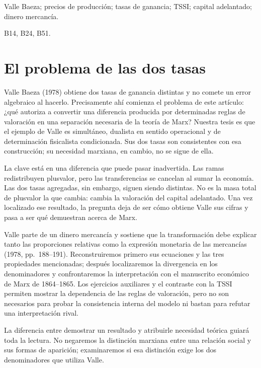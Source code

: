 \documentclass[10pt,twoside]{article}
\begin{document}
\vspace{5mm}
 Valle Baeza; precios de producción; tasas de ganancia; TSSI; capital adelantado; dinero mercancía.\par
\vspace{3mm}
 B14, B24, B51.\par
\clearpage

\section{El problema de las dos tasas}
Valle Baeza (1978) obtiene dos tasas de ganancia distintas y no comete un error algebraico al hacerlo. Precisamente ahí comienza el problema de este artículo: ¿qué autoriza a convertir una diferencia producida por determinadas reglas de valoración en una separación necesaria de la teoría de Marx? Nuestra tesis es que el ejemplo de Valle es simultáneo, dualista en sentido operacional y de determinación fisicalista condicionada. Sus dos tasas son consistentes con esa construcción; su necesidad marxiana, en cambio, no se sigue de ella.

La clave está en una diferencia que puede pasar inadvertida. Las ramas redistribuyen plusvalor, pero las transferencias se cancelan al sumar la economía. Las dos tasas agregadas, sin embargo, siguen siendo distintas. No es la masa total de plusvalor la que cambia: cambia la valoración del capital adelantado. Una vez localizado ese resultado, la pregunta deja de ser cómo obtiene Valle sus cifras y pasa a ser qué demuestran acerca de Marx.

Valle parte de un dinero mercancía y sostiene que la transformación debe explicar tanto las proporciones relativas como la expresión monetaria de las mercancías (1978, pp.~188--191). Reconstruiremos primero sus ecuaciones y las tres propiedades mencionadas; después localizaremos la divergencia en los denominadores y confrontaremos la interpretación con el manuscrito económico de Marx de 1864--1865. Los ejercicios auxiliares y el contraste con la TSSI permiten mostrar la dependencia de las reglas de valoración, pero no son necesarios para probar la consistencia interna del modelo ni bastan para refutar una interpretación rival.

La diferencia entre demostrar un resultado y atribuirle necesidad teórica guiará toda la lectura. No negaremos la distinción marxiana entre una relación social y sus formas de aparición; examinaremos si esa distinción exige los dos denominadores que utiliza Valle.
\end{document}
